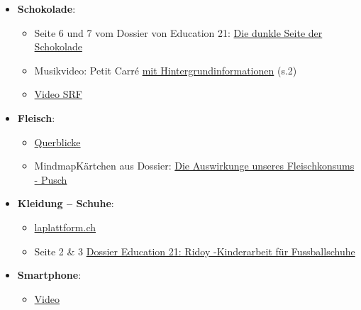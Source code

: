 \begin{myexercise}
    \begin{textBox}[title=Hintergrund-Informationen und Recherche-Materialien]
        \begin{itemize}
            \item \textbf{Schokolade}:
                  \begin{itemize}
                      \item Seite 6 und 7 vom Dossier von Education 21: \href{https://www.education21.ch/sites/default/files/uploads/pdf-d/bne-kit/BNE-Kit_Chocolat_Cycle 3_DE_201016.pdf}{Die dunkle Seite der Schokolade}
                      \item Musikvideo: Petit Carré \href{https://www.youtube.com/watch?v=1MCYpsGFv_s&ab_channel=JonasMusic}{mit Hintergrundinformationen} (s.2)
                      \item \href{https://www.srf.ch/play/tv/rundschau/video/die-spur-des-kakao-kinderarbeit-auf-der-plantage?urn=urn%3Asrf%3Avideo%3A71e90aae-c17b-4213-a36b-c32566568b2c}{Video SRF}
                  \end{itemize}
            \item \textbf{Fleisch}:
                  \begin{itemize}
                      \item \href{https://querblicke.ch/7-rind-und-fleisch/}{Querblicke}
                      \item MindmapKärtchen aus Dossier: \href{https://www.pusch.ch/fileadmin/kundendaten/de/Schule/Unterrichtsvorschlaege/Abfall_Konsum_Littering/05_Konsum/Die_Auswirkungen_unseres_Fleischkonsums_OS.pdf}{Die Auswirkunge unseres Fleischkonsums - Pusch}
                  \end{itemize}

            \item \textbf{Kleidung -- Schuhe}:
                  \begin{itemize}
                      \item \href{https://laplattform.ch/?record=schweiz-7484&src=online&standort=BE&pid=lvhp7e1jmuc2p1luknt0c51r51#b84f6bbd59f68f8390abb8b480a66258}{laplattform.ch}
                      \item Seite 2 \& 3 \href{https://education21.ch/sites/default/files/2020-08/5.06.07545.de_.pdf}{Dossier Education 21: Ridoy -Kinderarbeit für Fussballschuhe}
                  \end{itemize}

            \item \textbf{Smartphone}:
                  \begin{itemize}
                      \item \href{https://www.youtube.com/watch?v=Pjujd-zWlrE&ab_channel=HermannLietzAlumni%2CFreunde%26.Altb%C3%BCrger}{Video}


\end{itemize}
\end{itemize}
\end{textBox}
\end{myexercise}

